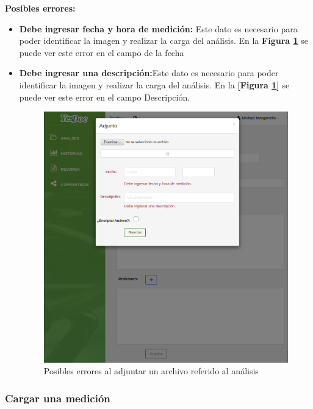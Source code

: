  	\textbf{Posibles errores:}
 	\begin{itemize}
 		\item \textbf{Debe ingresar fecha y hora de medición:} Este dato es necesario para poder identificar la imagen y realizar la carga del análisis. En la \textbf{Figura \ref{mu-adjuntar_archivo_error}} se puede ver este error en el campo de la fecha
 		\item \textbf{Debe ingresar una descripción:}Este dato es necesario para poder identificar la imagen y realizar la carga del análisis. En la \textbf{[Figura \ref{mu-adjuntar_archivo_error}]} se puede ver este error en el campo Descripción.
 		
 		\begin{figure}
 			\centering
 			\includegraphics[width=.8\textwidth]{img/manual_de_usuario/mu-adjuntar_archivo_error}
 			\caption{Posibles errores al adjuntar un archivo referido al análisis}
 			\label{mu-adjuntar_archivo_error}	
 		\end{figure}
 		
 		
 	\end{itemize}
 	
 	
 		
 	\subsubsection{Cargar una medición} 
 	
